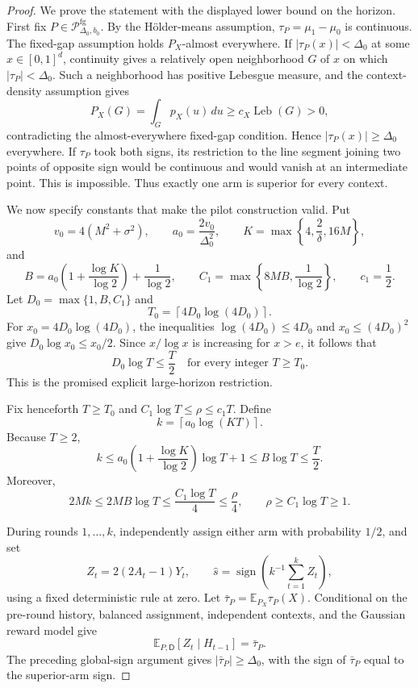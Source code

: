 \documentclass{article}
\begin{document}
\begin{proof}
We prove the statement with the displayed lower bound on the horizon.  First fix
\(P\in\mathcal P_{\Delta_0,b_0}^{\mathrm{fg}}\).  By the H\"older-means
assumption, \(\tau_P=\mu_1-\mu_0\) is continuous.  The fixed-gap assumption
holds \(P_X\)-almost everywhere.  If \(|\tau_P(x)|<\Delta_0\) at some
\(x\in[0,1]^d\), continuity gives a relatively open neighborhood \(G\) of
\(x\) on which \(|\tau_P|<\Delta_0\).  Such a neighborhood has positive
Lebesgue measure, and the context-density assumption gives
\[
 P_X(G)=\int_G p_X(u)\,du\geq c_X\operatorname{Leb}(G)>0,
\]
contradicting the almost-everywhere fixed-gap condition.  Hence
\(|\tau_P(x)|\geq\Delta_0\) everywhere.  If \(\tau_P\) took both signs, its
restriction to the line segment joining two points of opposite sign would be
continuous and would vanish at an intermediate point.  This is impossible.
Thus exactly one arm is superior for every context.

We now specify constants that make the pilot construction valid.  Put
\[
 v_0=4(M^2+\sigma^2),\qquad
 a_0=\frac{2v_0}{\Delta_0^2},\qquad
 K=\max\left\{4,\frac{2}{\delta},16M\right\},
\]
and
\[
 B=a_0\left(1+\frac{\log K}{\log 2}\right)+\frac{1}{\log 2},
 \qquad
 C_1=\max\left\{8MB,\frac{1}{\log 2}\right\},
 \qquad c_1=\frac12.
\]
Let \(D_0=\max\{1,B,C_1\}\) and
\[
 T_0=\left\lceil4D_0\log(4D_0)\right\rceil.
\]
For \(x_0=4D_0\log(4D_0)\), the inequalities
\(\log(4D_0)\leq4D_0\) and
\(x_0\leq(4D_0)^2\) give
\(D_0\log x_0\leq x_0/2\).  Since \(x/\log x\) is increasing for
\(x>e\), it follows that
\[
 D_0\log T\leq\frac{T}{2}
 \quad\text{for every integer }T\geq T_0.
\]
This is the promised explicit large-horizon restriction.

Fix henceforth \(T\geq T_0\) and
\(C_1\log T\leq\rho\leq c_1T\).  Define
\[
 k=\left\lceil a_0\log(KT)\right\rceil.
\]
Because \(T\geq2\),
\[
 k\leq a_0\left(1+\frac{\log K}{\log2}\right)\log T+1
 \leq B\log T\leq\frac{T}{2}.
\]
Moreover,
\[
 2Mk\leq2MB\log T\leq\frac{C_1\log T}{4}\leq\frac\rho4,
 \qquad
 \rho\geq C_1\log T\geq1.
\]

During rounds \(1,\ldots,k\), independently assign either arm with
probability \(1/2\), and set
\[
 Z_t=2(2A_t-1)Y_t,\qquad
 \widehat s=\operatorname{sign}\left(k^{-1}\sum_{t=1}^k Z_t\right),
\]
using a fixed deterministic rule at zero.  Let
\(\bar\tau_P=\mathbb E_{P_X}\tau_P(X)\).  Conditional on the pre-round
history, balanced assignment, independent contexts, and the Gaussian reward
model give
\[
 \mathbb E_{P,\mathsf D}[Z_t\mid H_{t-1}]=\bar\tau_P.
\]
The preceding global-sign argument gives
\(|\bar\tau_P|\geq\Delta_0\), with the sign of \(\bar\tau_P\) equal to the
superior-arm sign.


\end{proof}
\end{document}
